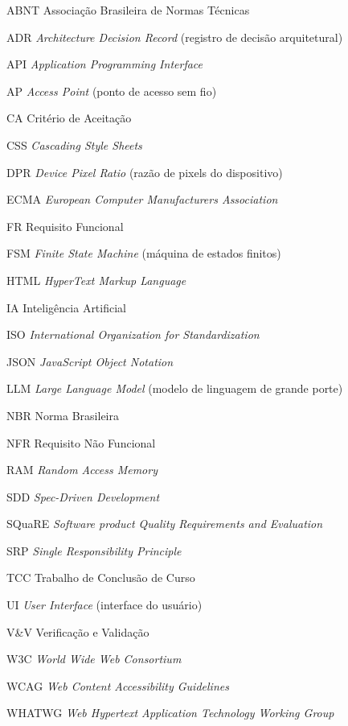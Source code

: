 \listofquadro
\newpage

\listoftables
\newpage

\begin{siglas}
	\item[ABNT] Associação Brasileira de Normas Técnicas
	\item[ADR] \textit{Architecture Decision Record} (registro de decisão arquitetural)
	\item[API] \textit{Application Programming Interface}
	\item[AP] \textit{Access Point} (ponto de acesso sem fio)
	\item[CA] Critério de Aceitação
	\item[CSS] \textit{Cascading Style Sheets}
	\item[DPR] \textit{Device Pixel Ratio} (razão de pixels do dispositivo)
	\item[ECMA] \textit{European Computer Manufacturers Association}
	\item[FR] Requisito Funcional
	\item[FSM] \textit{Finite State Machine} (máquina de estados finitos)
	\item[HTML] \textit{HyperText Markup Language}
	\item[IA] Inteligência Artificial
	\item[ISO] \textit{International Organization for Standardization}
	\item[JSON] \textit{JavaScript Object Notation}
	\item[LLM] \textit{Large Language Model} (modelo de linguagem de grande porte)
	\item[NBR] Norma Brasileira
	\item[NFR] Requisito Não Funcional
	\item[RAM] \textit{Random Access Memory}
	\item[SDD] \textit{Spec-Driven Development}
	\item[SQuaRE] \textit{Software product Quality Requirements and Evaluation}
	\item[SRP] \textit{Single Responsibility Principle}
	\item[TCC] Trabalho de Conclusão de Curso
	\item[UI] \textit{User Interface} (interface do usuário)
	\item[V\&V] Verificação e Validação
	\item[W3C] \textit{World Wide Web Consortium}
	\item[WCAG] \textit{Web Content Accessibility Guidelines}
	\item[WHATWG] \textit{Web Hypertext Application Technology Working Group}
\end{siglas}

